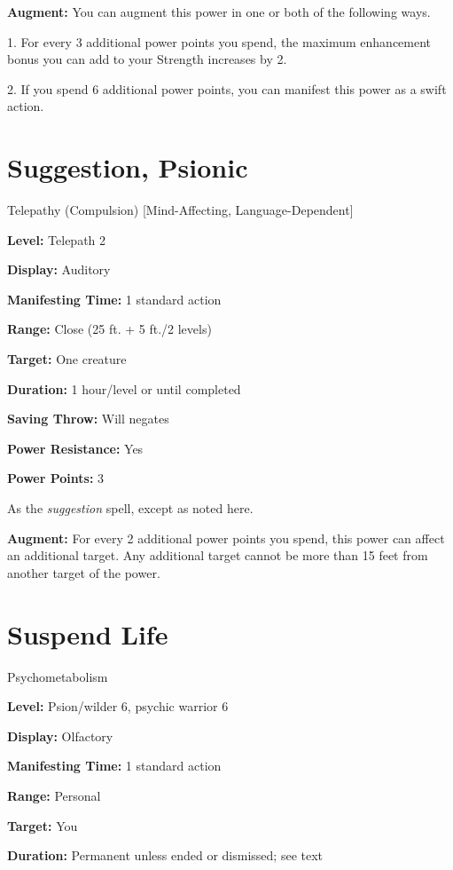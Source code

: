\documentclass{article}
\begin{document}
\textbf{Augment:} You can augment this power in one or both of the following ways.

1. For every 3 additional power points you spend, the maximum enhancement bonus 
you can add to your Strength increases by 2.

2. If you spend 6 additional power points, you can manifest this power as a swift 
action.

\vspace{12pt}
\section*{Suggestion, Psionic}

Telepathy (Compulsion) [Mind-Affecting, Language-Dependent]

\textbf{Level:} Telepath 2

\textbf{Display:} Auditory

\textbf{Manifesting Time:} 1 standard action

\textbf{Range:} Close (25 ft. + 5 ft./2 levels)

\textbf{Target:} One creature

\textbf{Duration:} 1 hour/level or until completed

\textbf{Saving Throw:} Will negates

\textbf{Power Resistance:} Yes

\textbf{Power Points:} 3

As the \textit{suggestion }spell, except as noted here.

\textbf{Augment:} For every 2 additional power points you spend, this power can 
affect an additional target. Any additional target cannot be more than 15 feet 
from another target of the power.

\vspace{12pt}
\section*{Suspend Life}

Psychometabolism

\textbf{Level:} Psion/wilder 6, psychic warrior 6

\textbf{Display:} Olfactory

\textbf{Manifesting Time:} 1 standard action

\textbf{Range:} Personal

\textbf{Target:} You

\textbf{Duration:} Permanent unless ended or dismissed; see text
\end{document}
